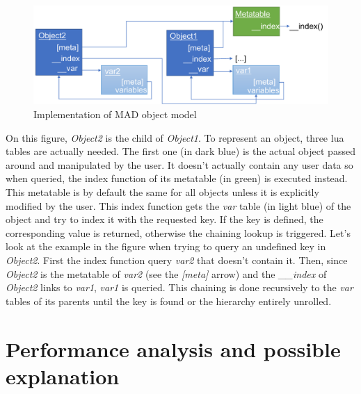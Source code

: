 \begin{figure}[H]
    \centering
    \includegraphics[width=\textwidth]{./Images/MO.pdf}
    \caption{Implementation of MAD object model}
    \label{fig:MO-descriptinon}
\end{figure}

On this figure, \emph{Object2} is the child of \emph{Object1}. To represent an
object, three lua tables are actually needed. The first one (in dark blue) is
the actual object passed around and manipulated by the user. It doesn't actually
contain any user data so when queried, the index function of its metatable (in
green) is executed instead. This metatable is by default the same for all objects
unless it is explicitly modified by the user. This index function gets the
\emph{var} table (in light blue) of the object and try to index it with the
requested key. If the key is defined, the corresponding value is returned,
otherwise the chaining lookup is triggered. Let's look at the example in the
figure when trying to query an undefined key in \emph{Object2}.
First the index function query \emph{var2} that doesn't contain it. Then, since
\emph{Object2} is the metatable of \emph{var2} (see the \emph{[meta]} arrow) and
the \emph{\_\_index} of \emph{Object2} links to \emph{var1}, \emph{var1} is queried.
This chaining is done recursively to the \emph{var} tables of its parents until the
key is found or the hierarchy entirely unrolled.


\section{Performance analysis and possible explanation}
\label{Sec:MO-perf-analys}

%

